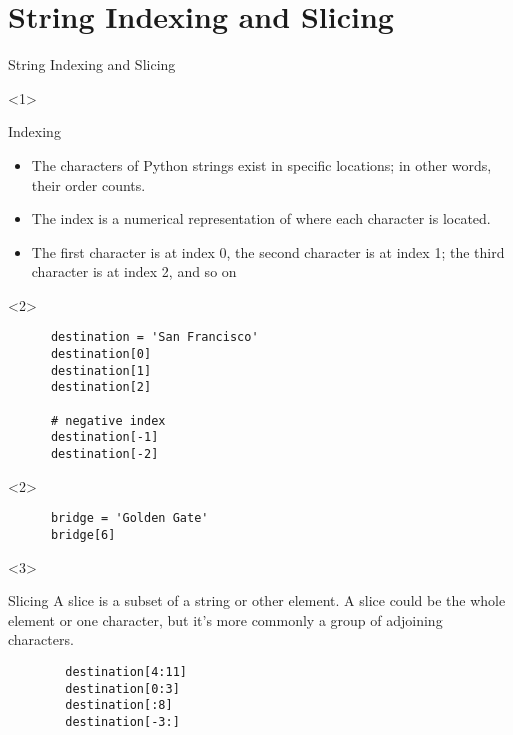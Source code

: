 \documentclass[../main.tex]{subfiles}
\begin{document}
\section{String Indexing and Slicing}
\label{sec:stringindexing}


\begin{frame}[fragile]{String Indexing and Slicing}
  \begin{onlyenv}<1>
    \begin{block}{Indexing} \justifying
    \begin{itemize} \justifying
    \item The characters of Python strings exist in specific locations; in other words, their order counts. 
    \item The index is a numerical representation of where each character is located. 
    \item The first \alert{character is at index 0}, the second character is at index 1; the third character is at index 2, and so on
    \end{itemize}
  \end{block}
  \end{onlyenv}

  \begin{onlyenv}<2>
      \begin{code}{}
    \begin{lstlisting}
      destination = 'San Francisco'
      destination[0]
      destination[1]
      destination[2]

      # negative index
      destination[-1]
      destination[-2]
    \end{lstlisting}
  \end{code}
\end{onlyenv}

\begin{onlyenv}<2>
  \begin{code}{}
    \begin{lstlisting}
      bridge = 'Golden Gate'
      bridge[6]
    \end{lstlisting}
  \end{code}
\end{onlyenv}

\begin{onlyenv}<3>
  \begin{block}{Slicing} \justifying
    A slice is \alert{a subset of a string or other element}. A slice could be the whole element or one character, but it's more commonly a group of adjoining characters.

    \begin{code}{}
      \begin{lstlisting}
        destination[4:11]
        destination[0:3]
        destination[:8]
        destination[-3:]
      \end{lstlisting}
    \end{code}
  \end{block}
\end{onlyenv}
\end{frame}
\end{document}
